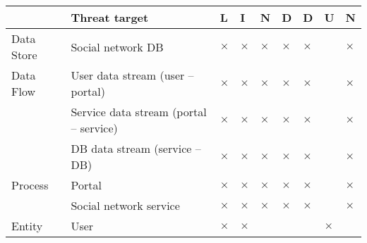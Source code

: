 

\begin{table}[h!]
\begin{center}
\caption{ \label{table:LINDDUN_mapping_MUCs}}
\begin{tabular}{p{2.3cm} p{9cm} p{0.2cm} p{0.2cm} p{0.2cm} p{0.2cm}p{0.2cm} p{0.2cm} p{0.2cm} }
\toprule[1pt]
& Threat target & L & I & N & D & D & U & N \\
\midrule[0.5pt]
Data Store &  Social network DB & $\times$ & $\times$ & $\times$ & $\times$ & $\times$ &  & $\times$ \\
\midrule[0.5pt]
Data Flow  &  User data stream (user -- portal) & $\times$ & $\times$ & $\times$& $\times$ & $\times$ & & $\times$ \\
           &  Service data stream (portal -- service) & $\times$ & $\times$ & $\times$& $\times$ &  $\times$ & & $\times$\\
           &  DB data stream (service -- DB)& $\times$ & $\times$ & $\times$& $\times$ &  $\times$ & & $\times$\\
\midrule[0.5pt]
Process & Portal & $\times$ & $\times$ & $\times$& $\times$ &  $\times$ & & $\times$\\
        & Social network service & $\times$ & $\times$ & $\times$& $\times$ &  $\times$ & & $\times$\\
\midrule[0.5pt]
Entity & User & $\times$ & $\times$ & & &  & $\times$ & \\
\bottomrule[1pt]
\end{tabular}
\end{center}

\end{table}

